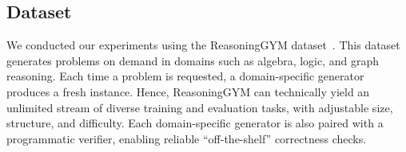 \documentclass[11pt, a4paper, logo, singlecolumn, copyright]{gensyn}
\begin{document}
\subsection{Dataset}\label{subsec:data}
We conducted our experiments using the ReasoningGYM dataset~\citep{stojanovski2025reasoninggymreasoningenvironments}. This dataset generates problems on demand in domains such as algebra, logic, and graph reasoning. Each time a problem is requested, a domain-specific generator produces a fresh instance. Hence, ReasoningGYM can technically yield an unlimited stream of diverse training and evaluation tasks, with adjustable size, structure, and difficulty. Each domain-specific generator is also paired with a programmatic verifier, enabling reliable ``off-the-shelf'' correctness checks.
\end{document}
